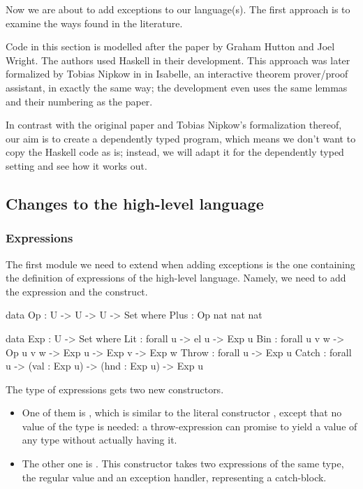 Now we are about to add exceptions to our language(s). The first approach is to
examine the ways found in the literature.

Code in this section is modelled after the paper \cite{gmh:exceptions} by
Graham Hutton and Joel Wright. The authors used Haskell in their development.
This approach was later formalized by Tobias Nipkow in \cite{nipkow} in
Isabelle, an interactive theorem prover/proof assistant, in exactly the same
way; the development even uses the same lemmas and their numbering as the
paper.

In contrast with the original paper and Tobias Nipkow's formalization thereof,
our aim is to create a dependently typed program, which means we don't want to
copy the Haskell code as is; instead, we will adapt it for the dependently
typed setting and see how it works out.

\subsection{Changes to the high-level language}

\subsubsection{Expressions}

The first module we need to extend when adding exceptions is the one containing
the definition of expressions of the high-level language. Namely, we need to
add the  expression and the  construct.

\begin{code}
  data Op : U -> U -> U -> Set where
    Plus : Op nat nat nat

  data Exp : U -> Set where
    Lit : forall {u} -> el u -> Exp u
    Bin : forall {u v w} -> Op u v w -> Exp u -> Exp v -> Exp w
    Throw : forall {u} -> Exp u
    Catch : forall {u} -> (val : Exp u) -> (hnd : Exp u) -> Exp u
\end{code}

\noindent The type of expressions gets two new constructors.
\begin{itemize}

  \item One of them is , which is similar to the literal
    constructor , except that no value of the type  is
    needed: a throw-expression can promise to yield a value of any type without
    actually having it.

  \item The other one is . This constructor takes two expressions of
    the same type, the regular value and an exception handler, representing a
    catch-block.

\end{itemize}

